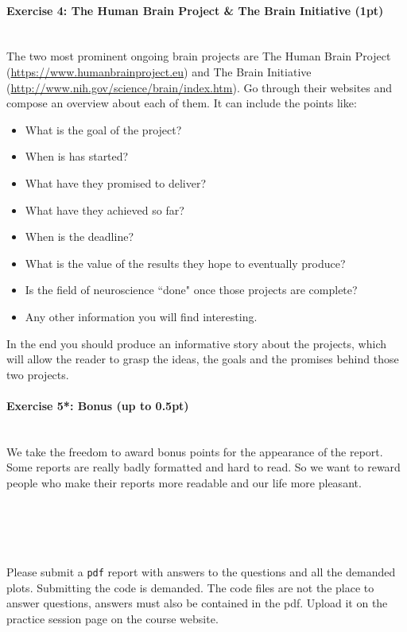 \documentclass[a4paper,11pt]{article}
\newenvironment{exercise}[3]{\paragraph{Exercise #1: #2 (#3pt)}\ \\}{
\medskip}
\begin{document}
\begin{exercise}{4}{The Human Brain Project \& The Brain Initiative}{1}
The two most prominent ongoing brain projects are The Human Brain Project (\url{https://www.humanbrainproject.eu}) and The Brain Initiative (\url{http://www.nih.gov/science/brain/index.htm}). Go through their websites and compose an overview about each of them. It can include the points like:
\begin{itemize}
\itemsep 0em
	\item What is the goal of the project?
	\item When is has started?
	\item What have they promised to deliver?
	\item What have they achieved so far?
	\item When is the deadline?
	\item What is the value of the results they hope to eventually produce?
	\item Is the field of neuroscience ``done" once those projects are complete?
	\item Any other information you will find interesting.
\end{itemize}
In the end you should produce an informative story about the projects, which will allow the reader to grasp the ideas, the goals and the promises behind those two projects.
\end{exercise}

\begin{exercise}{5*}{Bonus}{up to 0.5}
We take the freedom to award bonus points for the appearance of the report. Some reports are really badly formatted and hard to read. So we want to reward people who make their reports more readable and our life more pleasant.
\end{exercise}


\ \\
\ \\
\ \\
\ \\

Please submit a \texttt{pdf} report with answers to the questions and all the demanded plots. Submitting the code is demanded. The code files are not the place to answer questions, answers must also be contained in the pdf. Upload it on the practice session page on the course website.
\end{document}
